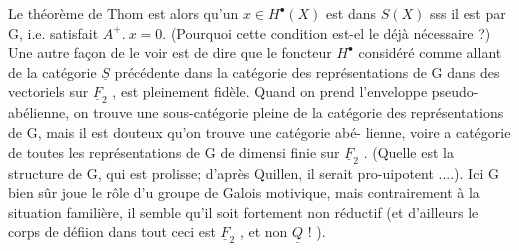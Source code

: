 

Le théorème de Thom est alors qu'un $x\in H^{\bullet}(X)$ est dans $S(X)$ sss il est
 par G, i.e. satisfait $A^{+}.\ x=0$. (Pourquoi cette condition est-el%
le déjà nécessaire ?) Une autre façon de le voir est de dire que le
foncteur $H^{\bullet}$ considéré comme allant de la catégorie $\underline{S}$ précédente dans
la catégorie des  représentations de G dans des vectoriels
sur $\underline{F}_2$ , est pleinement fidèle.  Quand on prend l'enveloppe
pseudo-abélienne, on trouve une sous-catégorie pleine de la catégorie des
représentations de G, mais il est douteux qu'on trouve une catégorie abé-%
lienne, voire a catégorie de toutes les représentations de G de dimensi
finie sur $\underline{F}_2$ . (Quelle est la structure de G, qui est prolisse; d'après
Quillen, il serait pro-uipotent ....). Ici G bien sûr joue le rôle d'u
groupe de Galois motivique, mais contrairement à la situation familière,
il semble qu'il soit fortement non réductif (et d'ailleurs le corps de
défiion dans tout ceci est $\underline{F}_2$ , et non $\underline{Q}$ ! ).

